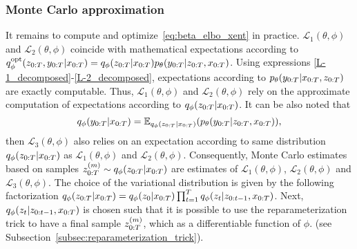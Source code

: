 \subsubsection{Monte Carlo approximation}
It remains to compute and optimize~\eqref{eq:beta_elbo_xent} in practice.
$\mathcal{L}_1(\theta,\phi)$
and $\mathcal{L}_2(\theta,\phi)$ coincide
with mathematical expectations according to  $q_\phi^{\rm opt}(z_{0:T},y_{0:T}|x_{0:T})=q_\phi(z_{0:T}|x_{0:T})p_{\theta}(y_{0:T}|z_{0:T},x_{0:T})$.
Using  expressions \eqref{L-1_decomposed}-\eqref{L-2_decomposed},
expectations according to $p_{\theta}(y_{0:T}|x_{0:T},z_{0:T})$
are exactly computable.
Thus, $\mathcal{L}_1(\theta,\phi)$ and $\mathcal{L}_2(\theta,\phi)$
rely on the approximate computation of expectations according to $q_\phi(z_{0:T}|x_{0:T})$. 
It can be also noted that $$q_\phi(y_{0:T}|x_{0:T})
={\mathbb{E}}_{q_\phi(z_{0:T}|x_{0:T})}(p_{\theta}(y_{0:T}|z_{0:T},x_{0:T})),$$  
then  $\mathcal{L}_3(\theta,\phi)$ 
also relies on an expectation according to 
same distribution $q_\phi(z_{0:T}|x_{0:T})$ as $\mathcal{L}_1(\theta,\phi)$ and $\mathcal{L}_2(\theta,\phi)$.
Consequently, Monte Carlo estimates based on \iid samples 
$z_{0:T}^{(m)} \sim q_\phi(z_{0:T}|x_{0:T})$ are  estimates 
of $\mathcal{L}_1(\theta,\phi)$, $\mathcal{L}_2(\theta,\phi)$
and $\mathcal{L}_3(\theta,\phi)$.
The choice of the variational distribution is given by the following
factorization  $q_\phi(z_{0:T}|x_{0:T})=q_\phi(z_0|x_{0:T})\prod_{t=1}^T q_\phi(z_t|z_{0:t-1},x_{0:T})$. 
Next, $q_\phi(z_t|z_{0:t-1},x_{0:T})$ is chosen such that it is
possible to use the reparameterization trick to have a final sample 
$z_{0:T}^{(m)}$, which as a
differentiable function of $\phi$.
(see Subsection~\ref{subsec:reparameterization_trick}).
